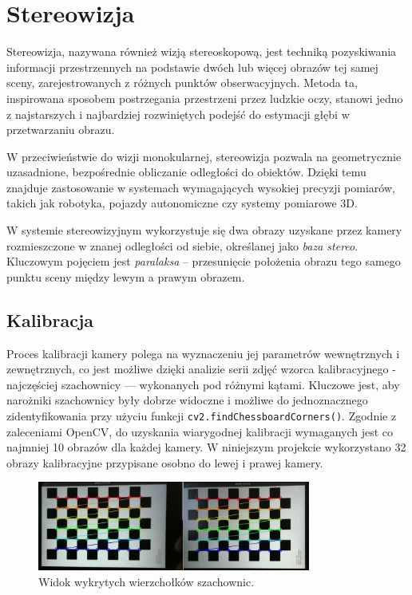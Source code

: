 \documentclass[magisterska]{pracadypl}
\begin{document}
\chapter{Stereowizja}

Stereowizja, nazywana również wizją stereoskopową, jest techniką pozyskiwania informacji przestrzennych na podstawie dwóch lub więcej obrazów tej samej sceny, zarejestrowanych z różnych punktów obserwacyjnych. Metoda ta, inspirowana sposobem postrzegania przestrzeni przez ludzkie oczy, stanowi jedno z najstarszych i najbardziej rozwiniętych podejść do estymacji głębi w przetwarzaniu obrazu.

W przeciwieństwie do wizji monokularnej, stereowizja pozwala na geometrycznie uzasadnione, bezpośrednie obliczanie odległości do obiektów. Dzięki temu znajduje zastosowanie w systemach wymagających wysokiej precyzji pomiarów, takich jak robotyka, pojazdy autonomiczne czy systemy pomiarowe 3D.

W systemie stereowizyjnym wykorzystuje się dwa obrazy uzyskane przez kamery rozmieszczone w znanej odległości od siebie, określanej jako \textit{baza stereo}. Kluczowym pojęciem jest \textit{paralaksa} – przesunięcie położenia obrazu tego samego punktu sceny między lewym a prawym obrazem.

\section{Kalibracja}

Proces kalibracji kamery polega na wyznaczeniu jej parametrów wewnętrznych i zewnętrznych, co jest możliwe dzięki analizie serii zdjęć wzorca kalibracyjnego - najczęściej szachownicy — wykonanych pod różnymi kątami. Kluczowe jest, aby narożniki szachownicy były dobrze widoczne i możliwe do jednoznacznego zidentyfikowania przy użyciu funkcji \texttt{cv2.findChessboardCorners()}. Zgodnie z zaleceniami OpenCV, do uzyskania wiarygodnej kalibracji wymaganych jest co najmniej 10 obrazów dla każdej kamery. W niniejszym projekcie wykorzystano 32 obrazy kalibracyjne przypisane osobno do lewej i prawej kamery.

\begin{figure}[H]  %
    \centering  %
    \includegraphics[width=0.8\textwidth]{images/calib.png}  %
    \captionsetup{font=footnotesize}
    \caption[Widok wykrytych wierzchołków szachownic. https://learnopencv.com/making-a-low-cost-stereo-camera-using-opencv/.]{Widok wykrytych wierzchołków szachownic.}
\end{figure}
\end{document}
